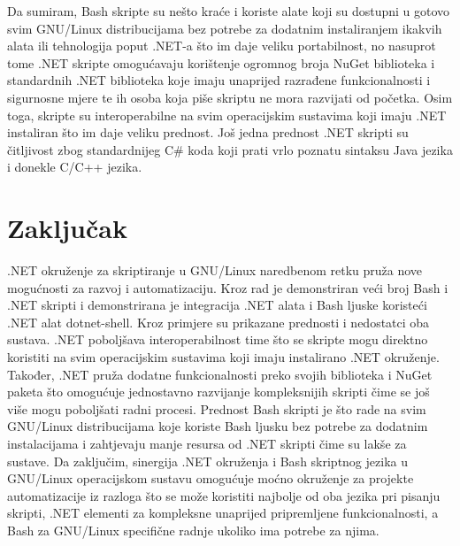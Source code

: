 \documentclass{foi}
\begin{document}
Da sumiram, Bash skripte su nešto kraće i koriste alate koji su dostupni u gotovo svim GNU/Linux distribucijama bez potrebe za dodatnim instaliranjem ikakvih alata ili tehnologija poput .NET-a što im daje veliku portabilnost, no nasuprot tome .NET skripte omogućavaju korištenje ogromnog broja NuGet biblioteka i standardnih .NET biblioteka koje imaju unaprijed razrađene funkcionalnosti i sigurnosne mjere te ih osoba koja piše skriptu ne mora razvijati od početka. Osim toga, skripte su interoperabilne na svim operacijskim sustavima koji imaju .NET instaliran što im daje veliku prednost. Još jedna prednost .NET skripti su čitljivost zbog standardnijeg C\# koda koji prati vrlo poznatu sintaksu Java jezika i donekle C/C++ jezika.
\chapter{Zaključak}
.NET okruženje za skriptiranje u GNU/Linux naredbenom retku pruža nove mogućnosti za razvoj i automatizaciju. Kroz rad je demonstriran veći broj Bash i .NET skripti i demonstrirana je integracija .NET alata i Bash ljuske koristeći .NET alat dotnet-shell. Kroz primjere su prikazane prednosti i nedostatci oba sustava. .NET poboljšava interoperabilnost time što se skripte mogu direktno koristiti na svim operacijskim sustavima koji imaju instalirano .NET okruženje. Također, .NET pruža dodatne funkcionalnosti preko svojih biblioteka i NuGet paketa što omogućuje jednostavno razvijanje kompleksnijih skripti čime se još više mogu poboljšati radni procesi. Prednost Bash skripti je što rade na svim GNU/Linux distribucijama koje koriste Bash ljusku bez potrebe za dodatnim instalacijama i zahtjevaju manje resursa od .NET skripti čime su lakše za sustave. Da zaključim, sinergija .NET okruženja i Bash skriptnog jezika u GNU/Linux operacijskom sustavu omogućuje moćno okruženje za projekte automatizacije iz razloga što se može koristiti najbolje od oba jezika pri pisanju skripti, .NET elementi za kompleksne unaprijed pripremljene funkcionalnosti, a Bash za GNU/Linux specifične radnje ukoliko ima potrebe za njima. 


\printbibliography[title=Popis literature]

\listoffigures
{}

\listoftables
{}
\end{document}

